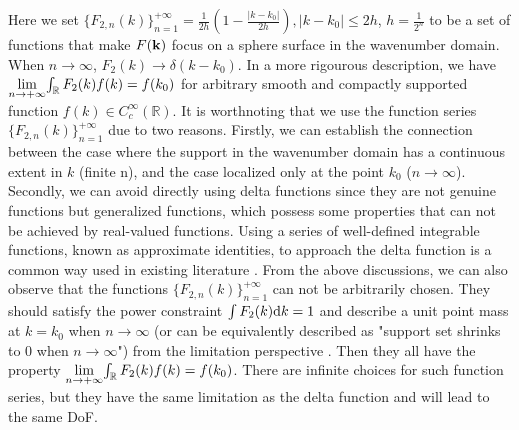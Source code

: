 \documentclass[12pt,draftclsnofoot,journal,onecolumn]{IEEEtran}
\begin{document}
	Here we set $\{F_{2,n}(k)\}_{n=1}^{+\infty} = \frac{1}{2h}\left( 1-\frac{|k-k_0|}{2h} \right), |k-k_0|\leqslant 2h$, $h = \frac{1}{2^n}$ to be a set of functions that make $F({\bf k})$ focus on a sphere surface in the wavenumber domain. When $n \rightarrow \infty$, $F_2(k) \rightarrow \delta(k-k_0)$. {\color{red} In a more rigourous description, we have $\underset{n \rightarrow +\infty}{\rm lim}{\int_{\mathbb{R}} F_2(k)f(k) } = f(k_0)$ for arbitrary smooth and compactly supported function $f(k) \in C_c^{\infty}({\mathbb R})$. It is worthnoting that we use the function series $\{F_{2,n}(k)\}_{n=1}^{+\infty}$ due to two reasons. Firstly, we can establish the connection between the case where the support in the wavenumber domain has a continuous extent in $k$ (finite n), and the case localized only at the point $k_0$ ($n \rightarrow \infty$). Secondly, we can avoid directly using delta functions since they are not genuine functions but generalized functions, which possess some properties that can not be achieved by real-valued functions. Using a series of well-defined integrable functions, known as approximate identities, to approach the delta function is a common way used in existing literature \cite{strichartz2003guide}. From the above discussions, we can also observe that the functions $\{F_{2,n}(k)\}_{n=1}^{+\infty}$ can not be arbitrarily chosen. They should satisfy the power constraint $\int F_2(k) {\rm d}k = 1$ and describe a unit point mass at $k = k_0$ when $n \rightarrow \infty$ (or can be equivalently described as "support set shrinks to 0 when $n \rightarrow \infty$")
	from the limitation perspective
	\cite{wheeler1997simplified}. 
	Then they all have the property $\underset{n \rightarrow +\infty}{\rm lim}{\int_{\mathbb{R}} F_2(k)f(k) } = f(k_0)$. There are infinite choices for such function series, but they have the same limitation as the delta function \cite{wheeler1997simplified} and will lead to the same DoF.} 
	
\end{document}
